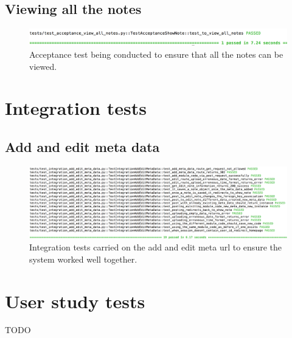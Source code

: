 \subsection{Viewing all the notes}

\begin{figure}[H]
  \centering
  \includegraphics[width=\textwidth]{images/test_acceptance_view_notes}
  \caption{Acceptance test being conducted to ensure that all the notes can be viewed.}
  \label{fig:acceptance_view_note}
\end{figure}


\section{Integration tests}
\label{appendix:integration_tests}

\subsection{Add and edit meta data}
\begin{figure}[H]
  \centering
  \includegraphics[width=\textwidth]{images/test_integration_add_edit_meta_data}
  \caption{Integration tests carried on the add and edit meta url to ensure the system worked well together.}
  \label{fig:integration_add_edit}
\end{figure}

\section{User study tests}
TODO
